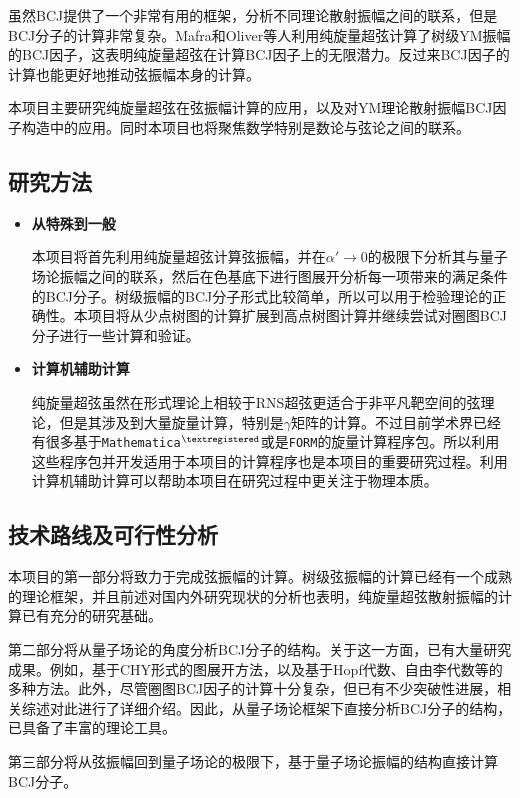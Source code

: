 \documentclass[type = bachelor]{whu-proposal}  %
\begin{document}
虽然BCJ提供了一个非常有用的框架，分析不同理论散射振幅之间的联系，但是BCJ分子的计算非常复杂。Mafra和Oliver等人利用纯旋量超弦计算了树级YM振幅的BCJ因子\cite{Mafra:2011nv}，这表明纯旋量超弦在计算BCJ因子上的无限潜力。反过来BCJ因子的计算也能更好地推动弦振幅本身的计算\cite{Geyer:2024oeu}。

本项目主要研究纯旋量超弦在弦振幅计算的应用，以及对YM理论散射振幅BCJ因子构造中的应用。同时本项目也将聚焦数学特别是数论与弦论之间的联系。

\subsection{研究方法}
\begin{itemize}
	\item \textbf{从特殊到一般}
	
	本项目将首先利用纯旋量超弦计算弦振幅，并在$\alpha'\to 0$的极限下分析其与量子场论振幅之间的联系，然后在色基底下进行图展开分析每一项带来的满足条件的BCJ分子。树级振幅的BCJ分子形式比较简单，所以可以用于检验理论的正确性。本项目将从少点树图的计算扩展到高点树图计算并继续尝试对圈图BCJ分子进行一些计算和验证。
	\item \textbf{计算机辅助计算}
	
	纯旋量超弦虽然在形式理论上相较于RNS超弦更适合于非平凡靶空间的弦理论，但是其涉及到大量旋量计算，特别是$\gamma$矩阵的计算。不过目前学术界已经有很多基于\texttt{Mathematica}$^{\textregistered}$或是\texttt{FORM}的旋量计算程序包\cite{Mertig:1990an,Mafra:2010pn}。所以利用这些程序包并开发适用于本项目的计算程序也是本项目的重要研究过程。利用计算机辅助计算可以帮助本项目在研究过程中更关注于物理本质。
\end{itemize}
\subsection{技术路线及可行性分析}
本项目的第一部分将致力于完成弦振幅的计算。树级弦振幅的计算已经有一个成熟的理论框架\cite{Schlotterer:2012zz}，并且前述对国内外研究现状的分析也表明，纯旋量超弦散射振幅的计算已有充分的研究基础。

第二部分将从量子场论的角度分析BCJ分子的结构。关于这一方面，已有大量研究成果。例如，基于CHY形式的图展开方法\cite{Du:2017kpo,Fu:2017uzt,Du:2016tbc}，以及基于Hopf代数\cite{Brandhuber:2022enp}、自由李代数\cite{Frost:2020eoa}等的多种方法。此外，尽管圈图BCJ因子的计算十分复杂，但已有不少突破性进展，相关综述\cite{Bern:2019prr}对此进行了详细介绍。因此，从量子场论框架下直接分析BCJ分子的结构，已具备了丰富的理论工具。

第三部分将从弦振幅回到量子场论的极限下，基于量子场论振幅的结构直接计算BCJ分子。
\end{document}
